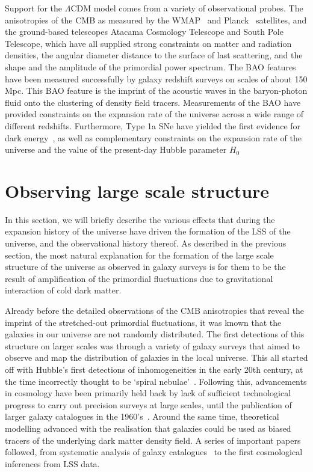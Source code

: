 Support for the $\Lambda$CDM model comes from a variety of observational probes. The anisotropies of the CMB as measured by the WMAP~\cite{Bennett:2013} and Planck~\cite{Aghanim:2018eyx} satellites, and the ground-based telescopes Atacama Cosmology Telescope and South Pole Telescope, which have all supplied strong constraints on matter and radiation densities, the angular diameter distance to the surface of last scattering, and the shape and the amplitude of the primordial power spectrum. The BAO features have been measured successfully by galaxy redshift surveys on scales of about 150 Mpc. This BAO feature is the imprint of the acoustic waves in the baryon-photon fluid onto the clustering of density field tracers. Measurements of the BAO have provided constraints on the expansion rate of the universe across a wide range of different redshifts.  Furthermore, Type 1a SNe have yielded the first evidence for dark energy~\cite{SupernovaSearchTeam:1998fmf,SupernovaCosmologyProject:1998vns}, as well as complementary constraints on the expansion rate of the universe and the value of the present-day Hubble parameter $H_0$

\section{Observing large scale structure}

In this section, we will briefly describe the various effects that during the expansion history of the universe have driven the formation of the LSS of the universe, and the observational history thereof. As described in the previous section, the most natural explanation for the formation of the large scale structure of the universe as observed in galaxy surveys is for them to be the result of amplification of the primordial fluctuations due to gravitational interaction of cold dark matter. 

Already before the detailed observations of the CMB anisotropies that reveal the imprint of the stretched-out primordial fluctuations, it was known that the galaxies in our universe are not randomly distributed. The first detections of this structure on larger scales was through a variety of galaxy surveys that aimed to observe and map the distribution of galaxies in the local universe. This all started off with Hubble's first detections of inhomogeneities in the early 20th century, at the time incorrectly thought to be `spiral nebulae'~\cite{Hubble:1926,Hubble:1934}. Following this, advancements in cosmology have been primarily held back by lack of sufficient technological progress to carry out precision surveys at large scales, until the publication of larger galaxy catalogues in the 1960's~\cite{Shane:1967,Zwicky:1961}. Around the same time, theoretical modelling advanced with the realisation that galaxies could be used as biased tracers of the underlying dark matter density field. A series of important papers followed, from systematic analysis of galaxy catalogues~\cite{Peebles:1973} to the first cosmological inferences from LSS data. 


